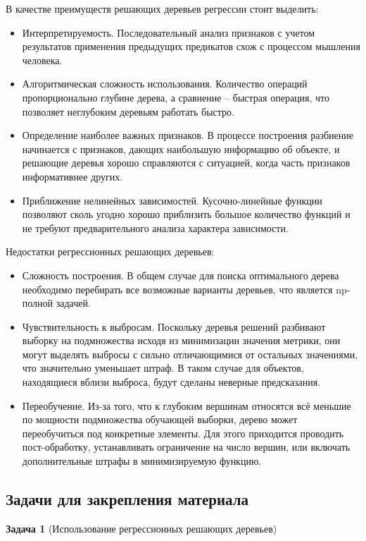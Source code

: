 В качестве преимуществ решающих деревьев регрессии стоит выделить:
\begin{itemize}
    \item Интерпретируемость. Последовательный анализ признаков с учетом результатов применения предыдущих предикатов схож с процессом мышления человека.
    \item Алгоритмическая сложность использования. Количество операций пропорционально глубине дерева, а сравнение -- быстрая операция, что позволяет неглубоким деревьям работать быстро.
    \item Определение наиболее важных признаков. В процессе построения разбиение начинается с признаков, дающих наибольшую информацию об объекте, и решающие деревья хорошо справляются с ситуацией, когда часть признаков информативнее других.
    \item Приближение нелинейных зависимостей. Кусочно-линейные функции позволяют сколь угодно хорошо приблизить большое количество функций и не требуют предварительного анализа характера зависимости.
\end{itemize}

Недостатки регрессионных решающих деревьев:
\begin{itemize}
    \item Сложность построения. В общем случае для поиска оптимального дерева необходимо перебирать все возможные варианты деревьев, что является np-полной задачей.
    \item Чувствительность к выбросам. Поскольку деревья решений разбивают выборку на подмножества исходя из минимизации значения метрики, они могут выделять выбросы с сильно отличающимися от остальных значениями, что значительно уменьшает штраф. В таком случае для объектов, находящиеся вблизи выброса, будут сделаны неверные предсказания. 
    \item Переобучение. Из-за того, что к глубоким вершинам относятся всё меньшие по мощности подмножества обучающей выборки, дерево может переобучиться под конкретные элементы. Для этого приходится проводить пост-обработку, устанавливать ограничение на число вершин, или включать дополнительные штрафы в минимизируемую функцию.
\end{itemize}

\subsection{Задачи для закрепления материала}
\textbf{Задача 1} (Использование регрессионных решающих деревьев)

